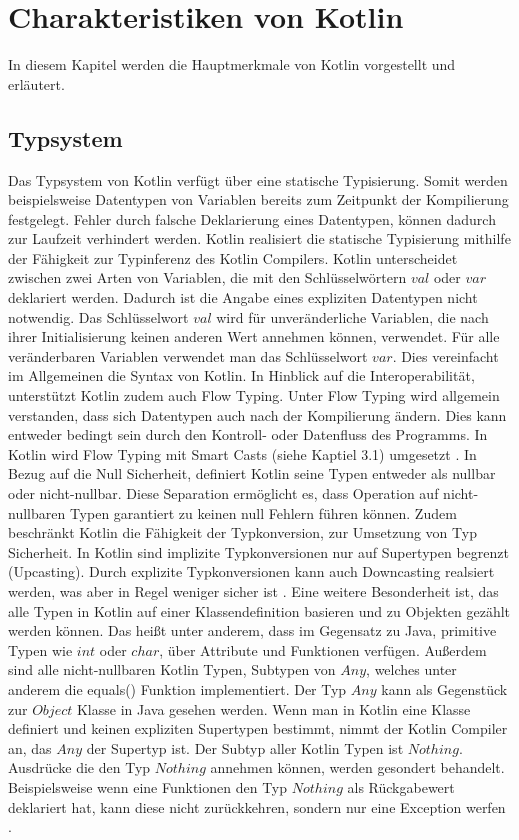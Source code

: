 \documentclass{article}
\begin{document}
\section{Charakteristiken von Kotlin}
In diesem Kapitel werden die Hauptmerkmale von Kotlin vorgestellt und erläutert.
\subsection{Typsystem}
Das Typsystem von Kotlin verfügt über eine statische Typisierung. Somit werden beispielsweise Datentypen von Variablen bereits zum Zeitpunkt der Kompilierung festgelegt. Fehler durch falsche Deklarierung eines Datentypen, können dadurch zur Laufzeit verhindert werden. Kotlin realisiert die statische Typisierung mithilfe der Fähigkeit zur Typinferenz des Kotlin Compilers. Kotlin unterscheidet zwischen zwei Arten von Variablen, die mit den Schlüsselwörtern $val$ oder $var$ deklariert werden.  Dadurch ist die Angabe eines expliziten Datentypen nicht notwendig. Das Schlüsselwort $val$ wird für unveränderliche Variablen, die nach ihrer Initialisierung keinen anderen Wert annehmen können, verwendet. Für alle veränderbaren Variablen verwendet man das Schlüsselwort $var$. Dies vereinfacht im Allgemeinen die Syntax von Kotlin. In Hinblick auf die Interoperabilität, unterstützt Kotlin zudem auch Flow Typing. Unter Flow Typing wird allgemein verstanden, dass sich Datentypen auch nach der Kompilierung ändern. Dies kann entweder bedingt sein durch den Kontroll- oder Datenfluss des Programms. In Kotlin wird Flow Typing mit Smart Casts (siehe Kaptiel 3.1) umgesetzt \cite{KotlinLangSpec}. \newline
In Bezug auf die Null Sicherheit, definiert Kotlin seine Typen entweder als nullbar oder nicht-nullbar. Diese Separation ermöglicht es, dass Operation auf nicht-nullbaren Typen garantiert zu keinen null Fehlern führen können. Zudem beschränkt Kotlin die Fähigkeit der Typkonversion, zur Umsetzung von Typ Sicherheit. In Kotlin sind implizite Typkonversionen nur auf Supertypen begrenzt (Upcasting). Durch explizite Typkonversionen kann auch Downcasting realsiert werden, was aber in Regel weniger sicher ist \cite{KotlinLangSpec}.\newline
Eine weitere Besonderheit ist, das alle Typen in Kotlin auf einer Klassendefinition basieren und zu Objekten gezählt werden können. Das heißt unter anderem, dass im Gegensatz zu Java, primitive Typen wie $int$ oder $char$, über Attribute und Funktionen verfügen. Außerdem sind alle nicht-nullbaren Kotlin Typen, Subtypen von $Any$, welches unter anderem die equals() Funktion implementiert. Der Typ $Any$ kann als Gegenstück zur $Object$ Klasse in Java gesehen werden. Wenn man in Kotlin eine Klasse definiert und keinen expliziten Supertypen bestimmt, nimmt der Kotlin Compiler an, das $Any$ der Supertyp ist. Der Subtyp aller Kotlin Typen ist $Nothing$. Ausdrücke die den Typ $Nothing$ annehmen können, werden gesondert behandelt. Beispielsweise wenn eine Funktionen den Typ $Nothing$ als Rückgabewert deklariert hat, kann diese nicht zurückkehren, sondern nur eine Exception werfen \cite{KotlinLangSpec}.
\end{document}
